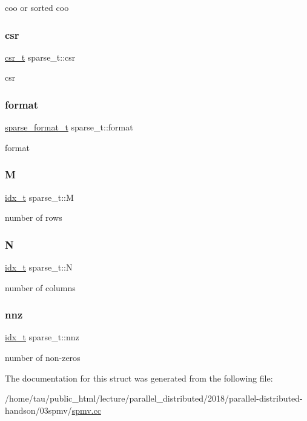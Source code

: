 coo or sorted coo \mbox{\label{structsparse__t_a68a71613181b0380d0d4d871236b2521}} 
\subsubsection{\texorpdfstring{csr}{csr}}
{\footnotesize\ttfamily \hyperlink{structcsr__t}{csr\+\_\+t} sparse\+\_\+t\+::csr}

csr \mbox{\label{structsparse__t_a1bb9e61c965f9ea814aab21f7ff77a73}} 
\subsubsection{\texorpdfstring{format}{format}}
{\footnotesize\ttfamily \hyperlink{spmv_8cc_a8c0094893526c01b430903b2d9227256}{sparse\+\_\+format\+\_\+t} sparse\+\_\+t\+::format}

format \mbox{\label{structsparse__t_a8a08bd7a16c76180afccf05e28f72a93}} 
\subsubsection{\texorpdfstring{M}{M}}
{\footnotesize\ttfamily \hyperlink{spmv_8cc_a8e93478a00e685bea5e6a3f617bf03a3}{idx\+\_\+t} sparse\+\_\+t\+::M}

number of rows \mbox{\label{structsparse__t_a418c6deef17a60f31ff11182ea94f85a}} 
\subsubsection{\texorpdfstring{N}{N}}
{\footnotesize\ttfamily \hyperlink{spmv_8cc_a8e93478a00e685bea5e6a3f617bf03a3}{idx\+\_\+t} sparse\+\_\+t\+::N}

number of columns \mbox{\label{structsparse__t_ae982d138f3904323b65975769b045a3f}} 
\subsubsection{\texorpdfstring{nnz}{nnz}}
{\footnotesize\ttfamily \hyperlink{spmv_8cc_a8e93478a00e685bea5e6a3f617bf03a3}{idx\+\_\+t} sparse\+\_\+t\+::nnz}

number of non-\/zeros 

The documentation for this struct was generated from the following file\+:\begin{DoxyCompactItemize}
\item 
/home/tau/public\+\_\+html/lecture/parallel\+\_\+distributed/2018/parallel-\/distributed-\/handson/03spmv/\hyperlink{spmv_8cc}{spmv.\+cc}\end{DoxyCompactItemize}
